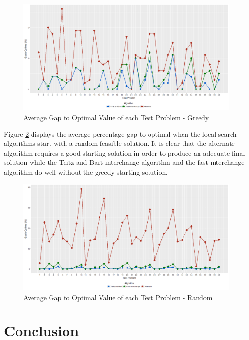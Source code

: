 \documentclass[11pt]{article}
\begin{document}
	\begin{figure}[H]
		\begin{center}
			\includegraphics[width=14cm]{greedygap.png}
			\caption{Average Gap to Optimal Value of each Test Problem - Greedy}
			\label{greedygap}
		\end{center}
	\end{figure}
	
	Figure \ref{randomgap} displays the average percentage gap to optimal when the local search algorithms start with a random feasible solution.  It is clear that the alternate algorithm requires a good starting solution in order to produce an adequate final solution while the Teitz and Bart interchange algorithm and the fast interchange algorithm do well without the greedy starting solution.
	
	\begin{figure}[H]
		\begin{center}
			\includegraphics[width=14cm]{randomgap.png}
			\caption{Average Gap to Optimal Value of each Test Problem - Random}
			\label{randomgap}
		\end{center}
	\end{figure}
		
	\section{Conclusion} \label{conclusion}
	
\end{document}
